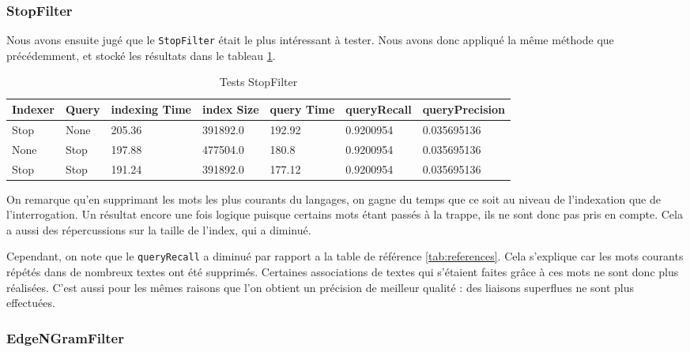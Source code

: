 \subsubsection{StopFilter}

Nous avons ensuite jugé que le \texttt{StopFilter} était le plus intéressant à tester. Nous avons donc appliqué la même méthode que précédemment, et stocké les résultats dans le tableau \ref{tab:tests_StopFilter}.

\begin{table}[!htbp]
    \hspace{-2cm}
                \begin{tabular}{|p{2cm}|p{2cm}|p{2cm}|p{2cm}|p{2.5cm}|p{2.5cm}|p{2.5cm}|}
                    \hline
                    \textbf{Indexer} & \textbf{Query} & \textbf{indexing Time} & \textbf{index Size} & \textbf{query Time} & \textbf{queryRecall} & \textbf{queryPrecision}\\
                    \hline
Stop & None & 205.36 & 391892.0 & 192.92 & 0.9200954 & 0.035695136\\
		\hline
None & Stop & 197.88 & 477504.0 & 180.8 & 0.9200954 & 0.035695136\\
		\hline
Stop & Stop & 191.24 & 391892.0 & 177.12 & 0.9200954 & 0.035695136\\
                    \hline
                \end{tabular}
                \caption{Tests StopFilter}
                \label{tab:tests_StopFilter}
            \end{table}

On remarque qu’en supprimant les mots les plus courants du langages, on gagne du temps que ce soit au niveau de l’indexation que de l’interrogation. Un résultat encore une fois logique puisque certains mots étant passés à la trappe, ils ne sont donc pas pris en compte. Cela a aussi des répercussions sur la taille de l’index, qui a diminué.
	
Cependant, on note que le \texttt{queryRecall} a diminué par rapport a la table de référence \ref{tab:references}. Cela s’explique car les mots courants répétés dans de nombreux textes ont été supprimés. Certaines associations de textes qui s’étaient faites grâce à ces mots ne sont donc plus réalisées. C’est aussi pour les mêmes raisons que l’on obtient un précision de meilleur qualité : des liaisons superflues ne sont plus effectuées.

\subsubsection{EdgeNGramFilter}

